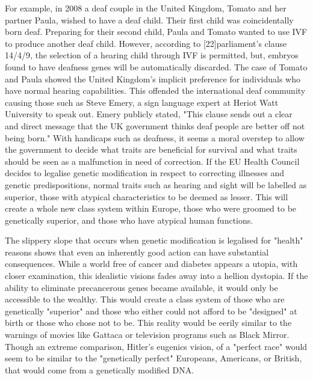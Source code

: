    For example, in 2008 a deaf couple in the United Kingdom, Tomato and
   her partner Paula, wished to have a deaf child. Their first child was
   coincidentally born deaf. Preparing for their second child, Paula and
   Tomato wanted to use IVF to produce another deaf child. However,
   according to [22]parliament's clause 14/4/9, the selection of a hearing
   child through IVF is permitted, but, embryos found to have deafness
   genes will be automatically discarded. The case of Tomato and Paula
   showed the United Kingdom's implicit preference for individuals who
   have normal hearing capabilities. This offended the international deaf
   community causing those such as Steve Emery, a sign language expert at
   Heriot Watt University to speak out. Emery publicly stated, "This
   clause sends out a clear and direct message that the UK government
   thinks deaf people are better off not being born." With handicaps such
   as deafness, it seems a moral overstep to allow the government to
   decide what traits are beneficial for survival and what traits should
   be seen as a malfunction in need of correction. If the EU Health
   Council decides to legalise genetic modification in respect to
   correcting illnesses and genetic predispositions, normal traits such as
   hearing and sight will be labelled as superior, those with atypical
   characteristics to be deemed as lesser. This will create a whole new
   class system within Europe, those who were groomed to be genetically
   superior, and those who have atypical human functions.

   The slippery slope that occurs when genetic modification is legalised
   for "health" reasons shows that even an inherently good action can have
   substantial consequences. While a world free of cancer and diabetes
   appears a utopia, with closer examination, this idealistic visions
   fades away into a hellion dystopia. If the ability to eliminate
   precancerous genes became available, it would only be accessible to the
   wealthy. This would create a class system of those who are genetically
   "superior" and those who either could not afford to be "designed" at
   birth or those who chose not to be. This reality would be eerily
   similar to the warnings of movies like Gattaca or television programs
   such as Black Mirror. Though an extreme comparison, Hitler's eugenics
   vision, of a "perfect race" would seem to be similar to the
   "genetically perfect" Europeans, Americans, or British, that would come
   from a genetically modified DNA.

